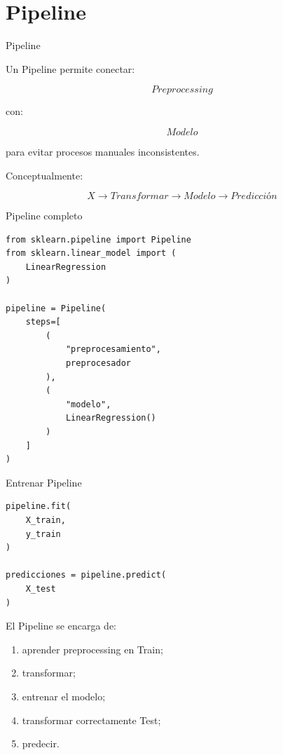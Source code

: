 \documentclass[aspectratio=169,11pt]{beamer}
\begin{document}
\section{Pipeline}

\begin{frame}{Pipeline}

Un Pipeline permite conectar:

\[
Preprocessing
\]

con:

\[
Modelo
\]

para evitar procesos manuales inconsistentes.

Conceptualmente:

\[
X
\rightarrow
Transformar
\rightarrow
Modelo
\rightarrow
Predicción
\]

\end{frame}


\begin{frame}[fragile]{Pipeline completo}

\begin{lstlisting}
from sklearn.pipeline import Pipeline
from sklearn.linear_model import (
    LinearRegression
)

pipeline = Pipeline(
    steps=[
        (
            "preprocesamiento",
            preprocesador
        ),
        (
            "modelo",
            LinearRegression()
        )
    ]
)
\end{lstlisting}

\end{frame}


\begin{frame}[fragile]{Entrenar Pipeline}

\begin{lstlisting}
pipeline.fit(
    X_train,
    y_train
)

predicciones = pipeline.predict(
    X_test
)
\end{lstlisting}

\vspace{0.4cm}

El Pipeline se encarga de:

\begin{enumerate}

    \item aprender preprocessing en Train;

    \item transformar;

    \item entrenar el modelo;

    \item transformar correctamente Test;

    \item predecir.

\end{enumerate}

\end{frame}
\end{document}
